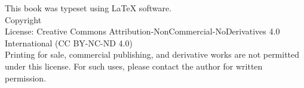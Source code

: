 \documentclass[oneside,openany]{book}
\makeatletter
\newcommand{\booklicense}{Creative Commons Attribution-NonCommercial-NoDerivatives 4.0 International (CC BY-NC-ND 4.0)}
\newcommand{\bookauthor}{\@author}
\theoremstyle{definition}
\theoremstyle{plain}
\theoremstyle{remark}
\makeatother
\begin{document}
\begin{titlepage}
\begin{flushleft}
    \noindent\begin{minipage}[b]{.7\linewidth}
      {\fontsize{9pt}{12pt}\selectfont
       \textbf{}\par}
      \vspace{2pt}
      {\fontsize{8pt}{11pt}\selectfont
       \par}
      \vspace{6pt}
      {\fontsize{8pt}{11pt}\selectfont
       \par}
    \end{minipage}%
    \hfill
    \begin{minipage}[b]{.25\linewidth}\raggedleft
      {\fontsize{8.5pt}{11pt}\selectfont
       \par}
    \end{minipage}

  \end{flushleft}
  \restoregeometry
\end{titlepage}

\color{black}
\rmfamily

\thispagestyle{empty}
\begin{flushleft}
\vspace*{\fill}
This book was typeset using \LaTeX{} software.\\
\vspace{\fill}
Copyright \textcopyright{} \the\year{}  \bookauthor\\
License: \booklicense\\
\vspace{0.5em}
Printing for sale, commercial publishing, and derivative works are not permitted under this license. For such uses, please contact the author for written permission.
\end{flushleft}

\addtocounter{page}{2}



\tableofcontents



\mainmatter

\end{document}
